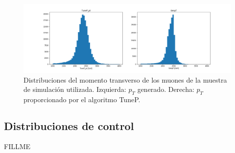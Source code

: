 \begin{figure}[h]
\centering
\includegraphics[width=1.0\textwidth]{figures/data_pt.png}
\caption{Distribuciones del momento transverso de los muones de la muestra de simulaci\'on utilizada. Izquierda: $p_{T}$ generado. Derecha: $p_{T}$ proporcionado por el algoritmo TuneP.}
\label{fig:data_pt}        
\end{figure}


\subsection{Distribuciones de control}\label{sec:plots}

FILLME
